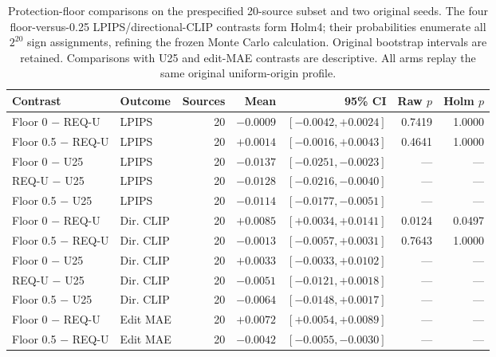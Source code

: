 \begin{table}[!t]
\centering\small
\caption{Protection-floor comparisons on the prespecified 20-source subset and two original seeds. The four floor-versus-0.25 LPIPS/directional-CLIP contrasts form Holm4; their probabilities enumerate all $2^{20}$ sign assignments, refining the frozen Monte Carlo calculation. Original bootstrap intervals are retained. Comparisons with U25 and edit-MAE contrasts are descriptive. All arms replay the same original uniform-origin profile.}
\label{tab:r91-floor}
\begin{tabular}{llrrrrr}
\toprule
Contrast & Outcome & Sources & Mean & 95\% CI & Raw $p$ & Holm $p$\\
\midrule
Floor 0 $-$ REQ-U & LPIPS & 20 & $-0.0009$ & $[-0.0042, +0.0024]$ & 0.7419 & 1.0000\\
Floor 0.5 $-$ REQ-U & LPIPS & 20 & $+0.0014$ & $[-0.0016, +0.0043]$ & 0.4641 & 1.0000\\
Floor 0 $-$ U25 & LPIPS & 20 & $-0.0137$ & $[-0.0251, -0.0023]$ & --- & ---\\
REQ-U $-$ U25 & LPIPS & 20 & $-0.0128$ & $[-0.0216, -0.0040]$ & --- & ---\\
Floor 0.5 $-$ U25 & LPIPS & 20 & $-0.0114$ & $[-0.0177, -0.0051]$ & --- & ---\\
Floor 0 $-$ REQ-U & Dir. CLIP & 20 & $+0.0085$ & $[+0.0034, +0.0141]$ & 0.0124 & 0.0497\\
Floor 0.5 $-$ REQ-U & Dir. CLIP & 20 & $-0.0013$ & $[-0.0057, +0.0031]$ & 0.7643 & 1.0000\\
Floor 0 $-$ U25 & Dir. CLIP & 20 & $+0.0033$ & $[-0.0033, +0.0102]$ & --- & ---\\
REQ-U $-$ U25 & Dir. CLIP & 20 & $-0.0051$ & $[-0.0121, +0.0018]$ & --- & ---\\
Floor 0.5 $-$ U25 & Dir. CLIP & 20 & $-0.0064$ & $[-0.0148, +0.0017]$ & --- & ---\\
Floor 0 $-$ REQ-U & Edit MAE & 20 & $+0.0072$ & $[+0.0054, +0.0089]$ & --- & ---\\
Floor 0.5 $-$ REQ-U & Edit MAE & 20 & $-0.0042$ & $[-0.0055, -0.0030]$ & --- & ---\\
\bottomrule
\end{tabular}
\end{table}
